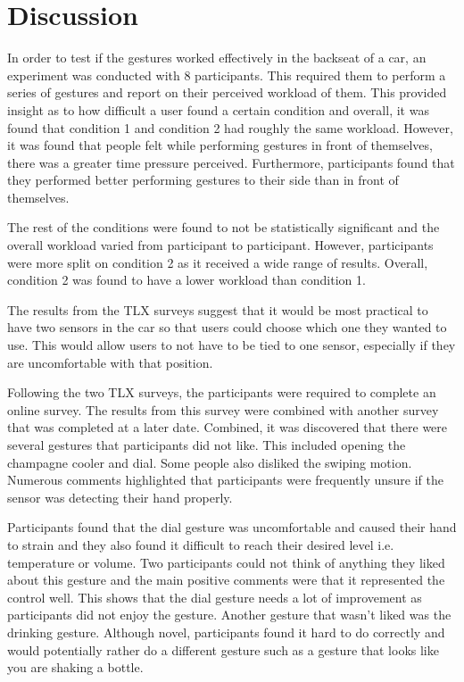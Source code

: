 \documentclass{l4proj}
\begin{document}
\section{Discussion}
In order to test if the gestures worked effectively in the backseat of a car, an experiment was conducted with 8 participants. This required them to perform a series of gestures and report on their perceived workload of them. This provided insight as to how difficult a user found a certain condition and overall, it was found that condition 1 and condition 2 had roughly the same workload. However, it was found that people felt while performing gestures in front of themselves, there was a greater time pressure perceived. Furthermore, participants found that they performed better performing gestures to their side than in front of themselves. 

The rest of the conditions were found to not be statistically significant and the overall workload varied from participant to participant. However, participants were more split on condition 2 as it received a wide range of results. Overall, condition 2 was found to have a lower workload than condition 1.

The results from the TLX surveys suggest that it would be most practical to have two sensors in the car so that users could choose which one they wanted to use. This would allow users to not have to be tied to one sensor, especially if they are uncomfortable with that position. 

Following the two TLX surveys, the participants were required to complete an online survey. The results from this survey were combined with another survey that was completed at a later date. Combined, it was discovered that there were several gestures that participants did not like. This included opening the champagne cooler and dial. Some people also disliked the swiping motion. Numerous comments highlighted that participants were frequently unsure if the sensor was detecting their hand properly. 

Participants found that the dial gesture was uncomfortable and caused their hand to strain and they also found it difficult to reach their desired level i.e. temperature or volume. Two participants could not think of anything they liked about this gesture and the main positive comments were that it represented the control well. This shows that the dial gesture needs a lot of improvement as participants did not enjoy the gesture. Another gesture that wasn't liked was the drinking gesture. Although novel, participants found it hard to do correctly and would potentially rather do a different gesture such as a gesture that looks like you are shaking a bottle.
\end{document}
